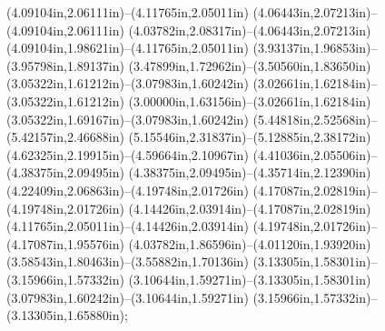 (4.09104in,2.06111in)--(4.11765in,2.05011in) (4.06443in,2.07213in)--(4.09104in,2.06111in) (4.03782in,2.08317in)--(4.06443in,2.07213in) (4.09104in,1.98621in)--(4.11765in,2.05011in) (3.93137in,1.96853in)--(3.95798in,1.89137in) (3.47899in,1.72962in)--(3.50560in,1.83650in) (3.05322in,1.61212in)--(3.07983in,1.60242in) (3.02661in,1.62184in)--(3.05322in,1.61212in) (3.00000in,1.63156in)--(3.02661in,1.62184in) (3.05322in,1.69167in)--(3.07983in,1.60242in) (5.44818in,2.52568in)--(5.42157in,2.46688in) (5.15546in,2.31837in)--(5.12885in,2.38172in) (4.62325in,2.19915in)--(4.59664in,2.10967in) (4.41036in,2.05506in)--(4.38375in,2.09495in) (4.38375in,2.09495in)--(4.35714in,2.12390in) (4.22409in,2.06863in)--(4.19748in,2.01726in) (4.17087in,2.02819in)--(4.19748in,2.01726in) (4.14426in,2.03914in)--(4.17087in,2.02819in) (4.11765in,2.05011in)--(4.14426in,2.03914in) (4.19748in,2.01726in)--(4.17087in,1.95576in) (4.03782in,1.86596in)--(4.01120in,1.93920in) (3.58543in,1.80463in)--(3.55882in,1.70136in) (3.13305in,1.58301in)--(3.15966in,1.57332in) (3.10644in,1.59271in)--(3.13305in,1.58301in) (3.07983in,1.60242in)--(3.10644in,1.59271in) (3.15966in,1.57332in)--(3.13305in,1.65880in);

